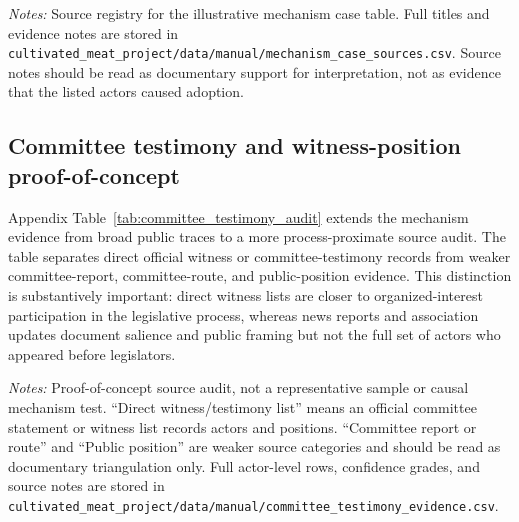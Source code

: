 \documentclass[12pt]{article}
\begin{document}
\begin{appendices}
{\scriptsize
\renewcommand{\arraystretch}{0.92}

}

\noindent\footnotesize\textit{Notes:} Source registry for the illustrative mechanism case table.  Full titles and evidence notes are stored in \texttt{cultivated\_meat\_project/data/manual/mechanism\_case\_sources.csv}.  Source notes should be read as documentary support for interpretation, not as evidence that the listed actors caused adoption.
\normalsize

\subsection*{Committee testimony and witness-position proof-of-concept}
\label{app:committee_testimony}

Appendix Table~\ref{tab:committee_testimony_audit} extends the mechanism evidence from broad public traces to a more process-proximate source audit.  The table separates direct official witness or committee-testimony records from weaker committee-report, committee-route, and public-position evidence.  This distinction is substantively important: direct witness lists are closer to organized-interest participation in the legislative process, whereas news reports and association updates document salience and public framing but not the full set of actors who appeared before legislators.

\begin{table}[htbp]
\centering
\begin{threeparttable}
\caption{Committee Testimony and Witness-Position Source Audit}
\label{tab:committee_testimony_audit}
{\tiny
\renewcommand{\arraystretch}{0.86}

}
\begin{tablenotes}[flushleft]
\footnotesize
\item \textit{Notes:} Proof-of-concept source audit, not a representative sample or causal mechanism test.  ``Direct witness/testimony list'' means an official committee statement or witness list records actors and positions.  ``Committee report or route'' and ``Public position'' are weaker source categories and should be read as documentary triangulation only.  Full actor-level rows, confidence grades, and source notes are stored in \texttt{cultivated\_meat\_project/data/manual/committee\_testimony\_evidence.csv}.
\end{tablenotes}
\end{threeparttable}
\end{table}


\end{appendices}
\end{document}
